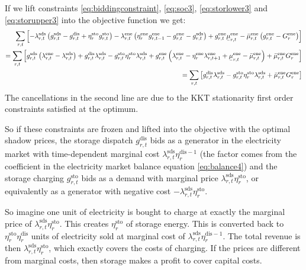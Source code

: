 \documentclass[final,3p,times]{elsarticle}
\newcommand{\ubar}[1]{\text{\b{$#1$}}}
\begin{document}
If we lift constraints \eqref{eq:biddingconstraint}, \eqref{eq:soc3}, \eqref{eq:storlower3} and \eqref{eq:storupper3} into the objective function we get:
\begin{align}
  \sum_{r,t} \left[ - \lambda^{\textrm{sds}}_{r,t} \left(  g^{\textrm{sds}}_{r,t} - g^{\textrm{dis}}_{r,t} + \eta^{\textrm{sto}}_r g^{\textrm{sto}}_{r,t}\right) - \lambda^{\textrm{ene}}_{r,t} \left(\eta^{\textrm{ene}}_r g^{\textrm{ene}}_{r,t-1} - g^{\textrm{ene}}_{r,t} - g^{\textrm{sds}}_{r,t}\right)  + g^{\textrm{ene}}_{r,t}\ubar{\mu}^{\textrm{ene}}_{r,t} -  \bar{\mu}^{\textrm{ene}}_{r,t}  \left(    g^{\textrm{ene}}_{r,t} - G^{\textrm{ene}}_r \right) \right] \\
  =   \sum_{r,t} \left[  g^{\textrm{sds}}_{r,t} \left(\lambda^{\textrm{ene}}_{r,t} - \lambda^{\textrm{sds}}_{r,t} \right)  +g^{\textrm{dis}}_{r,t}\lambda^{\textrm{sds}}_{r,t}  -  g^{\textrm{sto}}_{r,t} \eta^{\textrm{sto}}_r \lambda^{\textrm{sds}}_{r,t} + g^{\textrm{ene}}_{r,t}\left(\lambda^{\textrm{ene}}_{r,t} -\eta^{\textrm{ene}}_r \lambda^{\textrm{ene}}_{r,t+1}  + \ubar{\mu}^{\textrm{ene}}_{r,t} -  \bar{\mu}^{\textrm{ene}}_{r,t} \right) + \bar{\mu}^{\textrm{ene}}_{r,t} G^{\textrm{ene}}_r \right] \\
   =   \sum_{r,t} \left[ g^{\textrm{dis}}_{r,t}\lambda^{\textrm{sds}}_{r,t}  -  g^{\textrm{sto}}_{r,t} \eta^{\textrm{sto}}_r \lambda^{\textrm{sds}}_{r,t} + \bar{\mu}^{\textrm{ene}}_{r,t} G^{\textrm{ene}}_r \right]
\end{align}
The cancellations in the second line are due to the KKT stationarity first order constraints satisfied at the optimum.

So if these constraints are frozen and lifted into the objective with the optimal shadow prices, the storage dispatch $g^{\textrm{dis}}_{r,t}$ bids as a generator in the electricity market with time-dependent marginal cost $\lambda^{\textrm{sds}}_{r,t}\eta^{\textrm{dis} -1}_r $ (the factor comes from the coefficient in the electricity market balance equation \eqref{eq:balance4}) and the storage charging $g^{\textrm{sto}}_{r,t}$ bids as a demand with marginal price $\lambda^{\textrm{sds}}_{r,t} \eta^{\textrm{sto}}_r$, or equivalently as a generator with negative cost $-\lambda^{\textrm{sds}}_{r,t} \eta^{\textrm{sto}}_r$.

So imagine one unit of electricity is bought to charge at exactly the marginal price of $\lambda^{\textrm{sds}}_{r,t} \eta^{\textrm{sto}}_r$. This creates $\eta^{\textrm{sto}}_r$ of storage energy. This is converted back to $\eta^{\textrm{sto}}_r\eta^{\textrm{dis}}_r$ units of electricity sold at marginal cost of $\lambda^{\textrm{sds}}_{r,t}\eta^{\textrm{dis}-1}_r $. The total revenue is then $\lambda^{\textrm{sds}}_{r,t} \eta^{\textrm{sto}}_r$, which exactly covers the costs of charging. If the prices are different from marginal costs, then storage makes a profit to cover capital costs.
\end{document}
